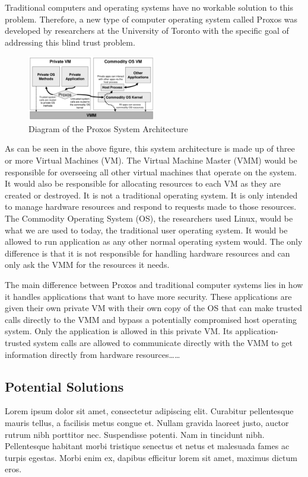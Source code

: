 \documentclass[conference, 12pt]{IEEEtran}
\begin{document}
Traditional computers and operating systems have no workable solution to this problem. Therefore, a new type of computer operating system called Proxos was developed by researchers at the University of Toronto with the specific goal of addressing this blind trust problem.

\begin{figure}[htbp]
    \centering
    \centerline{\includegraphics[width=0.5\textwidth]{Figure1.png}}
    \caption{Diagram of the Proxos System Architecture\cite{15}}
    \label{Figure1}
\end{figure}

As can be seen in the above figure, this system architecture is made up of three or more Virtual Machines (VM). The Virtual Machine Master (VMM) would be responsible for overseeing all other virtual machines that operate on the system. It would also be responsible for allocating resources to each VM as they are created or destroyed\cite{15}. It is not a traditional operating system. It is only intended to manage hardware resources and respond to requests made to those resources. The Commodity Operating System (OS), the researchers used Linux, would be what we are used to today, the traditional user operating system. It would be allowed to run application as any other normal operating system would. The only difference is that it is not responsible for handling hardware resources and can only ask the VMM for the resources it needs\cite{15}.

The main difference between Proxos and traditional computer systems lies in how it handles applications that want to have more security. These applications are given their own private VM with their own copy of the OS that can make trusted calls directly to the VMM and bypass a potentially compromised host operating system. Only the application is allowed in this private VM. Its application-trusted system calls are allowed to communicate directly with the VMM to get information directly from hardware resources……

\subsection{Potential Solutions}
Lorem ipsum dolor sit amet, consectetur adipiscing elit. Curabitur pellentesque mauris tellus, a facilisis metus congue et. Nullam gravida laoreet justo, auctor rutrum nibh porttitor nec. Suspendisse potenti. Nam in tincidunt nibh. Pellentesque habitant morbi tristique senectus et netus et malesuada fames ac turpis egestas. Morbi enim ex, dapibus efficitur lorem sit amet, maximus dictum eros. 
\end{document}
